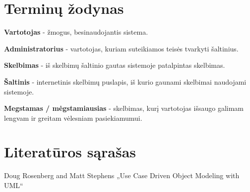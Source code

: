 \documentclass[12pt]{article}
\begin{document}
	\part*{Terminų žodynas}
	
	\bigskip
	\textbf{Vartotojas} - žmogus, besinaudojantis sistema.
	
	\textbf{Administratorius} - vartotojas, kuriam suteikiamos teisės tvarkyti šaltinius.
	
	\textbf{Skelbimas} - iš skelbimų šaltinio gautas sistemoje patalpintas skelbimas.
	
	\textbf{Šaltinis} - internetinis skelbimų puslapis, iš kurio gaunami skelbimai naudojami sistemoje.
	
	\textbf{Megstamas / mėgstamiausias} - skelbimas, kurį vartotojas išsaugo galimam lengvam ir greitam vėlesniam pasiekiamumui.
	\pagebreak

	\part*{Literatūros sąrašas}
	
	Doug Rosenberg and Matt Stephens „Use Case Driven Object Modeling with UML“
\end{document}
